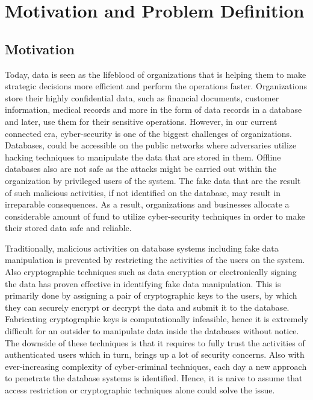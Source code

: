\chapter{Motivation and Problem Definition}
\label{chap:introduction}

\section{Motivation}
Today, data is seen as the lifeblood of organizations that is helping them to make strategic decisions more efficient and perform the operations faster. Organizations store their highly confidential data, such as financial documents, customer information, medical records and more in the form of data records in a database and later, use them for their sensitive operations. However, in our current connected era, cyber-security is one of the biggest challenges of organizations. Databases, could be accessible on the public networks where adversaries utilize hacking techniques to manipulate the data that are stored in them. Offline databases also are not safe as the attacks might be carried out within the organization by privileged users of the system. The fake data that are the result of such malicious activities, if not identified on the database, may result in irreparable consequences. As a result, organizations and businesses allocate a considerable amount of fund to utilize cyber-security techniques in order to make their stored data safe and reliable. 

Traditionally, malicious activities on database systems including fake data manipulation is prevented by restricting the activities of the users on the system. Also cryptographic techniques such as data encryption or electronically signing the data has proven effective in identifying fake data manipulation. This is primarily done by assigning a pair of cryptographic keys to the users, by which they can securely encrypt or decrypt the data and submit it to the database. Fabricating cryptographic keys is computationally infeasible, hence it is extremely difficult for an outsider to manipulate data inside the databases without notice. The downside of these techniques is that it requires to fully trust the activities of authenticated users which in turn, brings up a lot of security concerns. Also with ever-increasing complexity of cyber-criminal techniques, each day a new approach to penetrate the database systems is identified. Hence, it is naive to assume that access restriction or cryptographic techniques alone could solve the issue. 


